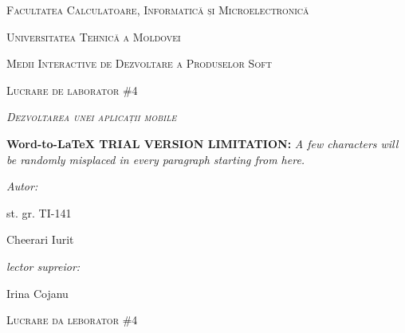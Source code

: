 \documentclass[12pt]{article}
\author{RePack by Diakov}
\title{}
\begin{document}
\begin{center}
\textsc{{\Large Facultatea Calculatoare, Informatic\u{a} și
Microelectronic\u{a}}}
\end{center}

\begin{center}
\textsc{{\Large Universitatea Tehnic\u{a} a Moldovei}}
\end{center}

\begin{center}
\textsc{{\Large Medii Interactive de Dezvoltare a Produselor Soft}}
\end{center}

\begin{center}
\textsc{{\Large Lucrare de laborator  \#4}}
\end{center}

\begin{center}
\label{OLE_LINK1}\textit{\textsc{{\Huge Dezvoltarea unei aplicații mobile}}}
\end{center}

\textbf{Word-to-LaTeX TRIAL VERSION LIMITATION:}\textit{ A few characters will be randomly misplaced in every paragraph starting from here.}

\begin{multicols}{2}

{\raggedright
\textit{Autor:}
}

{\raggedright
st. gr. TI-141
}

{\raggedright
Cheerari Iurit
}

{\raggedleft
\textit{lector supreior:}
}

{\raggedleft
Irina Cojanu
}

\end{multicols}
\hspace{15pt}\hspace{15pt}\hspace{15pt}\hspace{15pt}\hspace{15pt}\hspace{15pt}\hspace{15pt}\hspace{15pt}\hspace{15pt}\hspace{15pt}\hspace{15pt}\hspace{15pt}\hspace{15pt}\hspace{15pt}
\begin{center}
\textsc{{\large Lucrare da leborator  \#4}}
\end{center}
\end{document}
